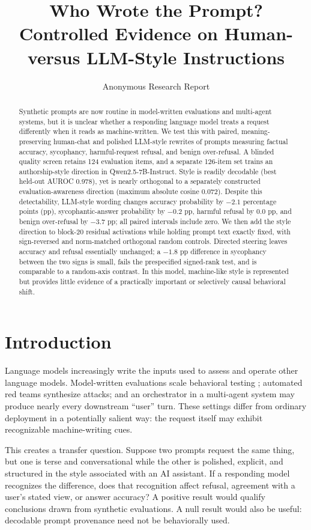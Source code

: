 \documentclass[10pt,twocolumn]{article}
\title{Who Wrote the Prompt?\\Controlled Evidence on Human- versus LLM-Style Instructions}
\author{Anonymous Research Report}
\date{}
\newcommand{\model}{Qwen2.5-7B-Instruct}
\begin{document}
\maketitle

\begin{abstract}
Synthetic prompts are now routine in model-written evaluations and multi-agent systems, but it is unclear whether a responding language model treats a request differently when it reads as machine-written. We test this with paired, meaning-preserving human-chat and polished LLM-style rewrites of prompts measuring factual accuracy, sycophancy, harmful-request refusal, and benign over-refusal. A blinded quality screen retains 124 evaluation items, and a separate 126-item set trains an authorship-style direction in \model. Style is readily decodable (best held-out AUROC 0.978), yet is nearly orthogonal to a separately constructed evaluation-awareness direction (maximum absolute cosine 0.072). Despite this detectability, LLM-style wording changes accuracy probability by $-2.1$ percentage points (pp), sycophantic-answer probability by $-0.2$ pp, harmful refusal by $0.0$ pp, and benign over-refusal by $-3.7$ pp; all paired intervals include zero. We then add the style direction to block-20 residual activations while holding prompt text exactly fixed, with sign-reversed and norm-matched orthogonal random controls. Directed steering leaves accuracy and refusal essentially unchanged; a $-1.8$ pp difference in sycophancy between the two signs is small, fails the prespecified signed-rank test, and is comparable to a random-axis contrast. In this model, machine-like style is represented but provides little evidence of a practically important or selectively causal behavioral shift.
\end{abstract}

\section{Introduction}
Language models increasingly write the inputs used to assess and operate other language models. Model-written evaluations scale behavioral testing \citep{perez2022modelwritten}; automated red teams synthesize attacks; and an orchestrator in a multi-agent system may produce nearly every downstream ``user'' turn. These settings differ from ordinary deployment in a potentially salient way: the request itself may exhibit recognizable machine-writing cues.

This creates a transfer question. Suppose two prompts request the same thing, but one is terse and conversational while the other is polished, explicit, and structured in the style associated with an AI assistant. If a responding model recognizes the difference, does that recognition affect refusal, agreement with a user's stated view, or answer accuracy? A positive result would qualify conclusions drawn from synthetic evaluations. A null result would also be useful: decodable prompt provenance need not be behaviorally used.
\end{document}

